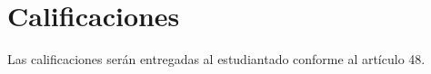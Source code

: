 \section{Calificaciones}
Las calificaciones serán entregadas al estudiantado conforme al artículo 48.
